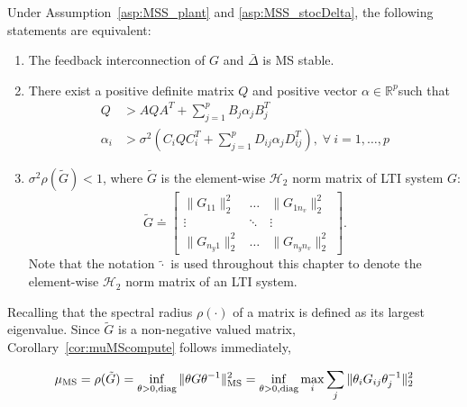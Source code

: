 \begin{thm}\label{thm:MSS}
Under Assumption~\ref{asp:MSS_plant} and \ref{asp:MSS_stocDelta}, the following statements are equivalent:
\begin{enumerate}
    \item The feedback interconnection of $G$ and $\bar{\Delta}$ is MS stable.
    \item There exist a positive definite matrix $Q$ and positive vector $\alpha\in \mathbb{R}^p$such that 
    \begin{subequations}
    \begin{align}
        Q & > A Q A^T+\sum_{j=1}^p B_j \alpha_j B_j^T\\
        \alpha_i&> \sigma^2(C_i Q C_i^T+\sum_{j=1}^p D_{ij}\alpha_j D_{ij}^T),\; \forall\ i=1,\hdots,p
    \end{align}
    \end{subequations}
    \item $\sigma^2\rho(\tilde{G})<1$, where \(\tilde{G}\) is the element-wise \(\mathcal{H}_2\) norm matrix of LTI system \(G\):
    \begin{equation}   
    \tilde{G} \doteq
    \left[
    \begin{array}{ccc}
        \|G_{11}\|_2^2 & \ldots & \|G_{1 n_v}\|_2^2\\
        \vdots & \ddots &\vdots\\
        \|G_{{n_y}1}\|_2^2 & \ldots & \|G_{{n_y}{n_v}}\|_2^2
    \end{array}
    \right].
    \end{equation}
Note that the notation $\tilde{\cdot}$ is used throughout this chapter to denote the element-wise $\mathcal{H}_2$ norm matrix of an LTI system.
\end{enumerate}
\end{thm}
Recalling that the spectral radius \(\rho(\cdot)\) of a matrix  is defined as its largest eigenvalue. Since \(\tilde{G}\) is a non-negative valued matrix, 
Corollary~\ref{cor:muMScompute} follows immediately,
\begin{cor}\label{cor:muMScompute}
\begin{equation}
\mu_{\rm{MS}}=\rho(\tilde{G})=\inf_{\theta>0,\mathrm{diag}}\|\theta G \theta^{-1}\|_{\rm{MS}}^2
    =\inf_{\theta>0,\mathrm{diag}} \max_{i}\sum_{j}\|\theta_{i}G_{ij}\theta_j^{-1}\|_2^2
\end{equation}
\end{cor}


